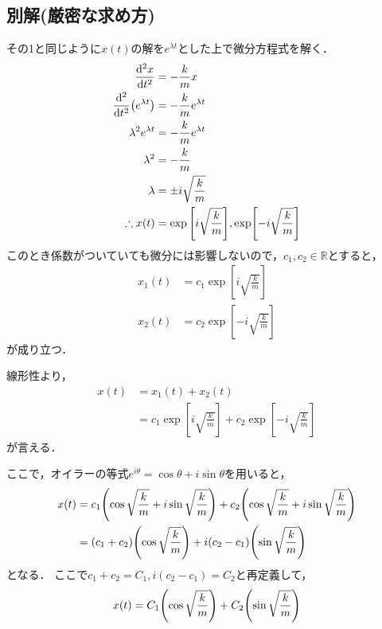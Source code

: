 \documentclass[uplatex]{jsarticle}
\begin{document}
\subsection{別解(厳密な求め方)}
その1と同じように$x(t)$の解を$e^{\lambda t}$とした上で微分方程式を解く．
\begin{align*}
	\dv[2]{x}{t} &= -\dfrac{k}{m}x \\
	\dv[2]{t}(e^{\lambda t}) &= -\dfrac{k}{m}e^{\lambda t} \\
	\lambda^2e^{\lambda t} &= -\dfrac{k}{m}e^{\lambda t}  \\
	\lambda^2 &= -\dfrac{k}{m} \\
	\lambda &= \pm i \sqrt{\dfrac{k}{m}} \\
	\therefore x(t) &= \exp\qty[{i \sqrt{\frac{k}{m}}}], \exp[{-i \sqrt{\frac{k}{m}}}]
\end{align*}
このとき係数がついていても微分には影響しないので，$c_1,c_2 \in \mathbb{R}$とすると，
\begin{align*}
	x_1(t) &= c_1\exp[{i \sqrt{\frac{k}{m}}}] \\
	x_2(t) &= c_2\exp[{-i \sqrt{\frac{k}{m}}}]
\end{align*}
が成り立つ．

線形性より，
\begin{align*}
	x(t) &= x_1(t) + x_2(t) \\
	&= c_1\exp[{i \sqrt{\frac{k}{m}}}] + c_2\exp[{-i \sqrt{\frac{k}{m}}}]
\end{align*}
が言える．

ここで，オイラーの等式$e^{i\theta} = \cos \theta + i\sin\theta$を用いると，
\begin{align*}
	x(t) &= c_1\qty(\cos\sqrt{\dfrac{k}{m}} + i\sin\sqrt{\dfrac{k}{m}}) + c_2\qty(\cos\sqrt{\dfrac{k}{m}} + i\sin\sqrt{\dfrac{k}{m}}) \\
	&= (c_1 + c_2)\qty(\cos\sqrt{\dfrac{k}{m}}) + i(c_2 - c_1)\qty(\sin\sqrt{\dfrac{k}{m}})
\end{align*}
となる．
ここで$c_1 + c_2 = C_1, i(c_2 - c_1) = C_2$と再定義して，
\begin{align*}
	x(t) = C_1\qty(\cos\sqrt{\dfrac{k}{m}}) + C_2\qty(\sin\sqrt{\dfrac{k}{m}})
\end{align*}
\end{document}
